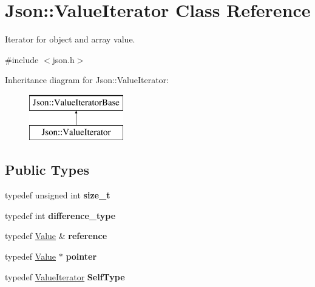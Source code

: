 \hypertarget{class_json_1_1_value_iterator}{\section{Json\-:\-:Value\-Iterator Class Reference}
\label{class_json_1_1_value_iterator}
}


Iterator for object and array value.  




{\ttfamily \#include $<$json.\-h$>$}

Inheritance diagram for Json\-:\-:Value\-Iterator\-:\begin{figure}[H]
\begin{center}
\leavevmode
\includegraphics[height=2.000000cm]{class_json_1_1_value_iterator}
\end{center}
\end{figure}
\subsection*{Public Types}
\begin{DoxyCompactItemize}
\item 
\hypertarget{class_json_1_1_value_iterator_a308b8932ffc83eaa9d12dadd5c11a7dd}{typedef unsigned int {\bfseries size\-\_\-t}}\label{class_json_1_1_value_iterator_a308b8932ffc83eaa9d12dadd5c11a7dd}

\item 
\hypertarget{class_json_1_1_value_iterator_a2be1a9aa60bbfc8812e9dd1a7f1a8786}{typedef int {\bfseries difference\-\_\-type}}\label{class_json_1_1_value_iterator_a2be1a9aa60bbfc8812e9dd1a7f1a8786}

\item 
\hypertarget{class_json_1_1_value_iterator_ae87929b4567aa00372cf602c43b57160}{typedef \hyperlink{class_json_1_1_value}{Value} \& {\bfseries reference}}\label{class_json_1_1_value_iterator_ae87929b4567aa00372cf602c43b57160}

\item 
\hypertarget{class_json_1_1_value_iterator_acec45feb1ef1f3bf81240157d06d5432}{typedef \hyperlink{class_json_1_1_value}{Value} $\ast$ {\bfseries pointer}}\label{class_json_1_1_value_iterator_acec45feb1ef1f3bf81240157d06d5432}

\item 
\hypertarget{class_json_1_1_value_iterator_a23357670fdad61792670d86f62db7e16}{typedef \hyperlink{class_json_1_1_value_iterator}{Value\-Iterator} {\bfseries Self\-Type}}\label{class_json_1_1_value_iterator_a23357670fdad61792670d86f62db7e16}

\end{DoxyCompactItemize}
